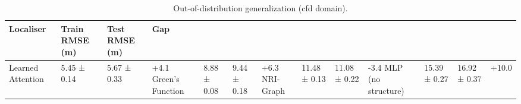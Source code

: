 \begin{table}
\caption{Out-of-distribution generalization (cfd domain).}
\label{tab:ood-cfd}
\begin{tabular}{llll}
\toprule
Localiser & Train RMSE (m) & Test RMSE (m) & Gap \\
\midrule
Learned Attention & 5.45 ± 0.14 & 5.67 ± 0.33 & +4.1%
Green's Function & 8.88 ± 0.08 & 9.44 ± 0.18 & +6.3%
NRI-Graph & 11.48 ± 0.13 & 11.08 ± 0.22 & -3.4%
MLP (no structure) & 15.39 ± 0.27 & 16.92 ± 0.37 & +10.0%
\bottomrule
\end{tabular}
\end{table}
